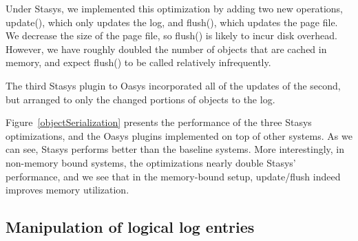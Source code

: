 \documentclass[letterpaper,twocolumn,10pt]{article}
\newcommand{\yad}{Stasys\xspace}
\newcommand{\yads}{Stasys'\xspace}
\newcommand{\oasys}{Oasys\xspace}
\begin{document}
Under \yad, we implemented this optimization by adding two new
operations, update(), which only updates the log, and flush(), which
updates the page file.  We decrease the size of the page file, so
flush() is likely to incur disk overhead.  However, we have roughly
doubled the number of objects that are cached in memory, and expect
flush() to be called relatively infrequently.

The third \yad plugin to \oasys incorporated all of the updates of the
second, but arranged to only the changed portions of objects to the
log.

Figure~\ref{objectSerialization} presents the performance of the three
\yad optimizations, and the \oasys plugins implemented on top of other
systems.  As we can see, \yad performs better than the baseline
systems.  More interestingly, in non-memory bound systems, the
optimizations nearly double \yads performance, and we see that in the
memory-bound setup, update/flush indeed improves memory utilization.


\subsection{Manipulation of logical log entries}
\end{document}
